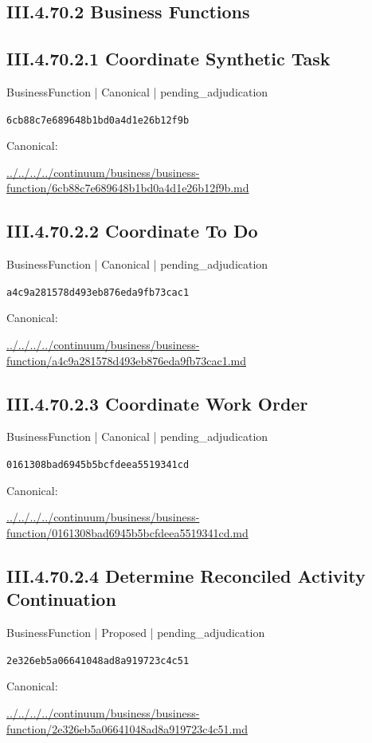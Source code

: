\documentclass[10pt,a4paper]{article}
\begin{document}
\subsection*{III.4.70.2 Business Functions}
\subsection*{III.4.70.2.1 Coordinate Synthetic Task}
{\small BusinessFunction | Canonical | pending\_adjudication}\par
\texttt{6cb88c7e689648b1bd0a4d1e26b12f9b}\par
Canonical: \par
{\footnotesize\url{../../../../continuum/business/business-function/6cb88c7e689648b1bd0a4d1e26b12f9b.md}}\par
\subsection*{III.4.70.2.2 Coordinate To Do}
{\small BusinessFunction | Canonical | pending\_adjudication}\par
\texttt{a4c9a281578d493eb876eda9fb73cac1}\par
Canonical: \par
{\footnotesize\url{../../../../continuum/business/business-function/a4c9a281578d493eb876eda9fb73cac1.md}}\par
\subsection*{III.4.70.2.3 Coordinate Work Order}
{\small BusinessFunction | Canonical | pending\_adjudication}\par
\texttt{0161308bad6945b5bcfdeea5519341cd}\par
Canonical: \par
{\footnotesize\url{../../../../continuum/business/business-function/0161308bad6945b5bcfdeea5519341cd.md}}\par
\subsection*{III.4.70.2.4 Determine Reconciled Activity Continuation}
{\small BusinessFunction | Proposed | pending\_adjudication}\par
\texttt{2e326eb5a06641048ad8a919723c4c51}\par
Canonical: \par
{\footnotesize\url{../../../../continuum/business/business-function/2e326eb5a06641048ad8a919723c4c51.md}}\par
\end{document}
